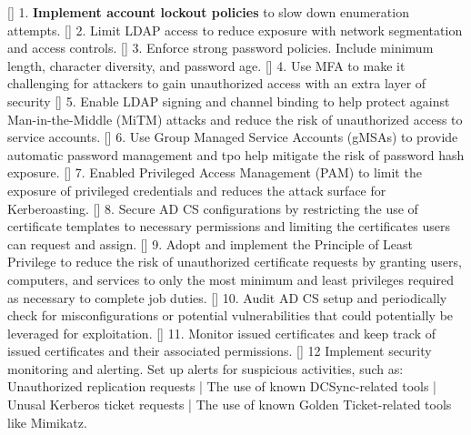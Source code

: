 [] 1. \textbf{Implement account lockout policies} to slow down enumeration attempts.
[] 2. Limit LDAP access to reduce exposure with network segmentation and access controls.
[] 3. Enforce strong password policies. Include minimum length, character diversity, and password age. 
[] 4. Use MFA to make it challenging for attackers to gain unauthorized access with an extra layer of security
[] 5. Enable LDAP signing and channel binding to help protect against Man-in-the-Middle (MiTM) attacks and reduce the risk of unauthorized access to service accounts.
[] 6. Use Group Managed Service Accounts (gMSAs) to provide automatic password management and tpo help mitigate the risk of password hash exposure.
[] 7. Enabled Privileged Access Management (PAM) to limit the exposure of privileged credentials and reduces the attack surface for Kerberoasting.
[] 8. Secure AD CS configurations by restricting the use of certificate templates to necessary permissions and limiting the certificates users can request and assign.
[] 9. Adopt and implement the Principle of Least Privilege to reduce the risk of unauthorized certificate requests by granting users, computers, and services to only the most minimum and least privileges required as necessary to complete job duties.
[] 10. Audit AD CS setup and periodically check for misconfigurations or potential vulnerabilities that could potentially be leveraged for exploitation.
[] 11. Monitor issued certificates and keep track of issued certificates and their associated permissions.
[] 12 Implement security monitoring and alerting. Set up alerts for suspicious activities, such as: Unauthorized replication requests | The use of known DCSync-related tools | Unusal Kerberos ticket requests | The use of known Golden Ticket-related tools like Mimikatz.













